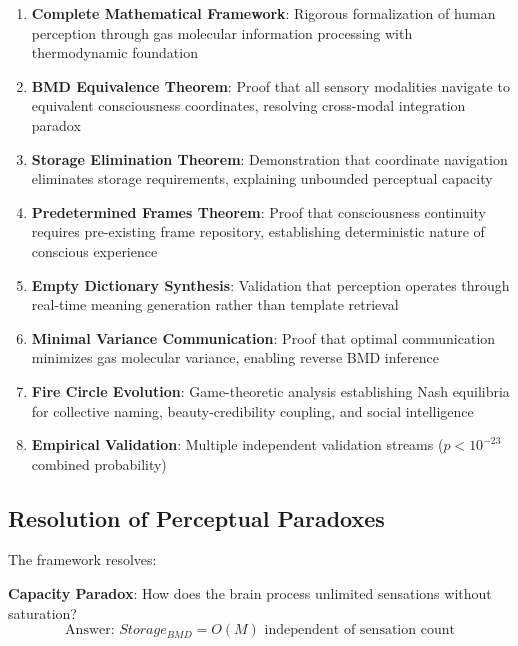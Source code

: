 \documentclass[12pt]{article}
\theoremstyle{definition}
\theoremstyle{remark}
\begin{document}
\begin{enumerate}
\item \textbf{Complete Mathematical Framework}: Rigorous formalization of human perception through gas molecular information processing with thermodynamic foundation

\item \textbf{BMD Equivalence Theorem}: Proof that all sensory modalities navigate to equivalent consciousness coordinates, resolving cross-modal integration paradox

\item \textbf{Storage Elimination Theorem}: Demonstration that coordinate navigation eliminates storage requirements, explaining unbounded perceptual capacity

\item \textbf{Predetermined Frames Theorem}: Proof that consciousness continuity requires pre-existing frame repository, establishing deterministic nature of conscious experience

\item \textbf{Empty Dictionary Synthesis}: Validation that perception operates through real-time meaning generation rather than template retrieval

\item \textbf{Minimal Variance Communication}: Proof that optimal communication minimizes gas molecular variance, enabling reverse BMD inference

\item \textbf{Fire Circle Evolution}: Game-theoretic analysis establishing Nash equilibria for collective naming, beauty-credibility coupling, and social intelligence

\item \textbf{Empirical Validation}: Multiple independent validation streams ($p < 10^{-23}$ combined probability)
\end{enumerate}

\subsection{Resolution of Perceptual Paradoxes}

The framework resolves:

\textbf{Capacity Paradox}: How does the brain process unlimited sensations without saturation?
\begin{equation}
\text{Answer: } Storage_{BMD} = O(M) \text{ independent of sensation count}
\end{equation}
\end{document}
